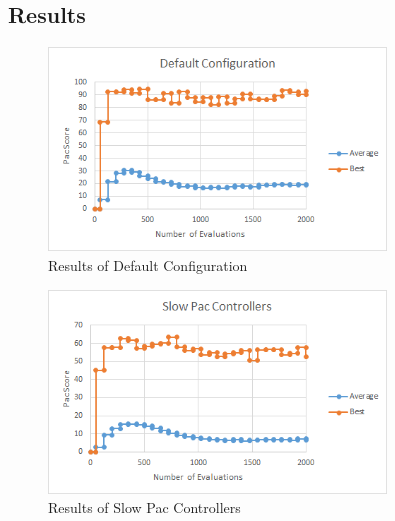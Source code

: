 \documentclass{article}
\begin{document}
\subsection{Results}
\begin{flushleft}
\begin{figure}[h]
	\centering
	\includegraphics[width=0.8\textwidth]{default}
	\caption{Results of Default Configuration}
\end{figure}

\clearpage

\begin{figure}[h]
	\centering
	\includegraphics[width=0.8\textwidth]{speedSlow}
	\caption{Results of Slow Pac Controllers}
\end{figure}
\end{flushleft}
\end{document}
